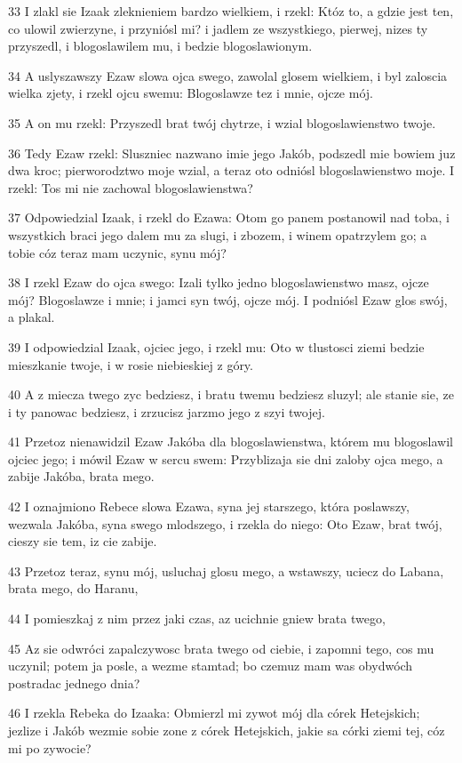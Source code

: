 \par 33 I zlakl sie Izaak zleknieniem bardzo wielkiem, i rzekl: Któz to, a gdzie jest ten, co ulowil zwierzyne, i przyniósl mi? i jadlem ze wszystkiego, pierwej, nizes ty przyszedl, i blogoslawilem mu, i bedzie blogoslawionym.
\par 34 A uslyszawszy Ezaw slowa ojca swego, zawolal glosem wielkiem, i byl zaloscia wielka zjety, i rzekl ojcu swemu: Blogoslawze tez i mnie, ojcze mój.
\par 35 A on mu rzekl: Przyszedl brat twój chytrze, i wzial blogoslawienstwo twoje.
\par 36 Tedy Ezaw rzekl: Sluszniec nazwano imie jego Jakób, podszedl mie bowiem juz dwa kroc; pierworodztwo moje wzial, a teraz oto odniósl blogoslawienstwo moje. I rzekl: Tos mi nie zachowal blogoslawienstwa?
\par 37 Odpowiedzial Izaak, i rzekl do Ezawa: Otom go panem postanowil nad toba, i wszystkich braci jego dalem mu za slugi, i zbozem, i winem opatrzylem go; a tobie cóz teraz mam uczynic, synu mój?
\par 38 I rzekl Ezaw do ojca swego: Izali tylko jedno blogoslawienstwo masz, ojcze mój? Blogoslawze i mnie; i jamci syn twój, ojcze mój. I podniósl Ezaw glos swój, a plakal.
\par 39 I odpowiedzial Izaak, ojciec jego, i rzekl mu: Oto w tlustosci ziemi bedzie mieszkanie twoje, i w rosie niebieskiej z góry.
\par 40 A z miecza twego zyc bedziesz, i bratu twemu bedziesz sluzyl; ale stanie sie, ze i ty panowac bedziesz, i zrzucisz jarzmo jego z szyi twojej.
\par 41 Przetoz nienawidzil Ezaw Jakóba dla blogoslawienstwa, którem mu blogoslawil ojciec jego; i mówil Ezaw w sercu swem: Przyblizaja sie dni zaloby ojca mego, a zabije Jakóba, brata mego.
\par 42 I oznajmiono Rebece slowa Ezawa, syna jej starszego, która poslawszy, wezwala Jakóba, syna swego mlodszego, i rzekla do niego: Oto Ezaw, brat twój, cieszy sie tem, iz cie zabije.
\par 43 Przetoz teraz, synu mój, usluchaj glosu mego, a wstawszy, uciecz do Labana, brata mego, do Haranu,
\par 44 I pomieszkaj z nim przez jaki czas, az ucichnie gniew brata twego,
\par 45 Az sie odwróci zapalczywosc brata twego od ciebie, i zapomni tego, cos mu uczynil; potem ja posle, a wezme stamtad; bo czemuz mam was obydwóch postradac jednego dnia?
\par 46 I rzekla Rebeka do Izaaka: Obmierzl mi zywot mój dla córek Hetejskich; jezlize i Jakób wezmie sobie zone z córek Hetejskich, jakie sa córki ziemi tej, cóz mi po zywocie?

